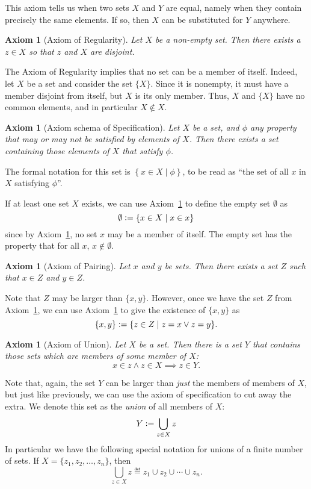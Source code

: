 \documentclass[a4paper, twoside, notitlepage, 11pt]{article}
\theoremstyle{plain}
\newtheorem{ax}[prop]{Axiom}
\theoremstyle{definition}
\theoremstyle{remark}
\numberwithin{equation}{section}
\begin{document}
This axiom tells us when two sets $X$ and $Y$ are equal, namely when they contain precisely the same elements.
If so, then $X$ can be substituted for $Y$ anywhere.

\begin{ax}[Axiom of Regularity] \label{ax:reg}
Let $X$ be a non-empty set. Then there exists a $z\in X$ so that $z$ and $X$ are disjoint.
\end{ax}

The Axiom of Regularity implies that no set can be a member of itself. Indeed, let $X$ be a set and consider
the set $\{X\}$. Since it is nonempty, it must have a member disjoint from itself, but $X$ is its only member.
Thus, $X$ and $\{X\}$ have no common elements, and in particular $X\not\in X$.

\begin{ax}[Axiom schema of Specification] \label{ax:spec}
Let $X$ be a set, and $\phi$ any property that may or may not be satisfied by elements of $X$. Then there
exists a set containing those elements of $X$ that satisfy $\phi$.
\end{ax}

The formal notation for this set is $\left\{ x \in X \;|\; \phi \right\}$, to be read as ``the set of all $x$
in $X$ satisfying $\phi$''.

If at least one set $X$ exists, we can use Axiom~\ref{ax:spec} to define the empty set $\emptyset$ as
\[
    \emptyset \vcentcolon= \left\{ x \in X \;|\; x \in x \right\}
\]
since by Axiom~\ref{ax:reg}, no set $x$ may be a member of itself. The empty set has the property that for all
$x$, $x\not\in\emptyset$.

\begin{ax}[Axiom of Pairing] \label{ax:pair}
Let $x$ and $y$ be sets. Then there exists a set $Z$ such that $x\in Z$ and $y\in Z$.
\end{ax}

Note that $Z$ may be larger than $\{x,y\}$. However, once we have the set $Z$ from Axiom~\ref{ax:pair}, we can
use Axiom~\ref{ax:spec} to give the existence of $\{x,y\}$ as
\[
    \{x,y\} \vcentcolon= \{ z \in Z \;|\; z=x \vee z=y \}.
\]

\begin{ax}[Axiom of Union] \label{ax:union}
Let $X$ be a set. Then there is a set $Y$ that contains those sets which are members of some member of $X$:
\[
    x \in z \wedge z \in X \implies z \in Y.
\]
\end{ax}

Note that, again, the set $Y$ can be larger than {\em just} the members of members of $X$, but just like
previously, we can use the axiom of specification to cut away the extra. We denote this set as the {\em
union} of all members of $X$: 
\[
    Y \vcentcolon= \bigcup_{z\in X} z
\]
In particular we have the following special notation for unions of a finite number of sets. If
$X=\{z_1,z_2,\ldots,z_n\}$, then 
\[
    \bigcup_{z\in X} z \eqdef z_1 \cup z_2 \cup \cdots \cup z_n.
\]
\end{document}
